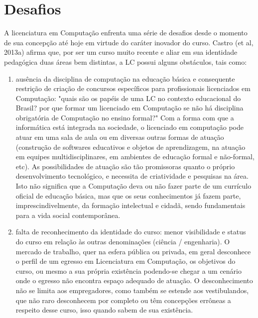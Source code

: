\section{Desafios}%
 
	A licenciatura em Computação enfrenta uma série de desafios desde o momento de sua concepção até hoje em virtude do caráter inovador do curso. Castro (et al, 2013a) afirma que, por ser um curso muito recente e aliar em sua identidade pedagógica duas áreas bem distintas, a LC possui alguns obstáculos, tais como:
    \begin{enumerate}
	\item ausência da disciplina de computação na educação básica e consequente restrição de criação de concursos específicos para profissionais licenciados em Computação: "quais são os papéis de uma LC no contexto educacional do Brasil? por que formar um licenciado em Computação se não há disciplina obrigatória de Computação no ensino formal?" Com a forma com que a informática está integrada na sociedade, o licenciado em computação pode atuar em uma sala de aula ou em diversas outras formas de atuação (construção de softwares educativos e objetos de aprendizagem, na atuação em equipes multidisciplinares, em ambientes de educação formal e não-formal, etc). As possibilidades de atuação são tão promissoras quanto o próprio desenvolvimento tecnológico, e necessita de criatividade e pesquisas na área. Isto não significa que a Computação deva ou não fazer parte de um currículo oficial de educação básica, mas que os seus conhecimentos já fazem parte, imprescindivelmente, da formação intelectual e cidadã, sendo fundamentais para a vida social contemporânea.
	\item falta de reconhecimento da identidade do curso: menor visibilidade e status do curso em relação às outras denominações (ciência / engenharia). O mercado de trabalho,  quer na esfera pública ou privada, em geral desconhece o perfil de um egresso em Licenciatura em Computação, os objetivos do curso, ou mesmo a sua própria existência podendo-se chegar a um cenário onde o egresso não encontra espaço adequado de atuação. O desconhecimento não se limita aos empregadores, como também se estende aos vestibulandos, que não raro desconhecem por completo ou têm concepções errôneas a respeito desse curso, isso quando sabem de sua existência.

\end{enumerate}
